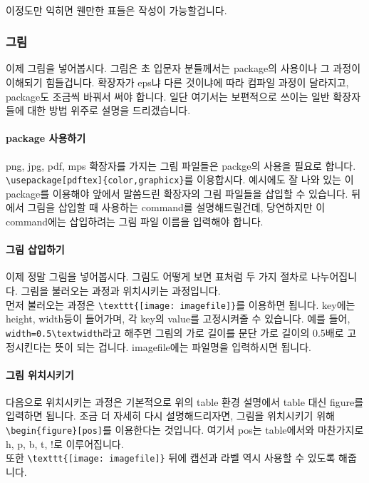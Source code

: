 \paragraph{}
이정도만 익히면 웬만한 표들은 작성이 가능할겁니다.

\subsubsection{그림}
\label{sec:advanced_2-pic}
이제 그림을 넣어봅시다.
그림은 초 입문자 분들께서는 package의 사용이나 그 과정이 이해되기 힘들겁니다.
확장자가 eps냐 다른 것이냐에 따라 컴파일 과정이 달라지고, package도 조금씩 바꿔서 써야 합니다.
일단 여기서는 보편적으로 쓰이는 일반 확장자들에 대한 방법 위주로 설명을 드리겠습니다.

\paragraph{package 사용하기}
png, jpg, pdf, mps 확장자를 가지는 그림 파일들은 packge의 사용을 필요로 합니다.
\verb|\usepackage[pdftex]{color,graphicx}|를 이용합시다.
예시에도 잘 나와 있는 이 package를 이용해야 앞에서 말씀드린 확장자의 그림 파일들을 삽입할 수 있습니다.
뒤에서 그림을 삽입할 때 사용하는 command를 설명해드릴건데, 당연하지만 이 command에는 삽입하려는 그림 파일 이름을 입력해야 합니다.

\paragraph{그림 삽입하기}
이제 정말 그림을 넣어봅시다.
그림도 어떻게 보면 표처럼 두 가지 절차로 나누어집니다.
그림을 불러오는 과정과 위치시키는 과정입니다.\\
먼저 불러오는 과정은 \verb|\texttt{[image: imagefile]}|를 이용하면 됩니다.
key에는 height, width등이 들어가며, 각 key의 value를 고정시켜줄 수 있습니다.
예를 들어, \verb|width=0.5\textwidth|라고 해주면 그림의 가로 길이를 문단 가로 길이의 0.5배로 고정시킨다는 뜻이 되는 겁니다.
imagefile에는 파일명을 입력하시면 됩니다.

\paragraph{그림 위치시키기}
다음으로 위치시키는 과정은 기본적으로 위의 table 환경 설명에서 table 대신 figure를 입력하면 됩니다.
조금 더 자세히 다시 설명해드리자면, 그림을 위치시키기 위해 \verb|\begin{figure}[pos]|를 이용한다는 것입니다.
여기서 pos는 table에서와 마찬가지로 h, p, b, t, !로 이루어집니다.\\
또한 \verb|\texttt{[image: imagefile]}| 뒤에 캡션과 라벨 역시 사용할 수 있도록 해줍니다.

